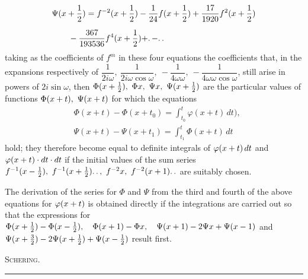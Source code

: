 \[
\begin{aligned}
&\Psi(x+\frac12)=f^{-2}(x+\frac12)-\frac{1}{24}f(x+\frac12)
+\frac{17}{1920}f^{2}(x+\frac12)\\[6pt]
&\qquad{}-\frac{367}{193536}f^{4}(x+\frac12)+\ldotp-\ldotp\ldotp
\end{aligned}
\]
taking as the coefficients of $f^m$ in these four equations the coefficients that, in the
expansions respectively of
$\dfrac{1}{2i\omega},\allowbreak{}\allowbreak \ \dfrac{1}{2i\omega\cos\omega},\allowbreak{}\allowbreak \ -\dfrac{1}{4\omega\omega},\allowbreak{}\allowbreak \ -\dfrac{1}{4\omega\omega\cos\omega}$,
still arise in powers of $2i\sin\omega$,
then $\Phi(x+\nobreak{}\tfrac12),\allowbreak{}\ \Phi x,\allowbreak{}\ \Psi x,\allowbreak{}\ \Psi(x+\nobreak{}\tfrac12)$ are the particular values of functions
$\Phi(x+\nobreak{}t),\allowbreak{}\ \Psi(x+\nobreak{}t)$
for which the equations
\[
\begin{aligned}
&\Phi(x+t)-\Phi(x+t_0)=\int_{t_0}^{t}\varphi(x+t)\,dt),\\[6pt]
&\Psi(x+t)-\Psi(x+t_1)=\int_{t_1}^{t}\Phi(x+t)\,dt
\end{aligned}
\]
hold; they therefore become equal to definite integrals of $\varphi(x+\nobreak{}t)\,\allowbreak{}dt$ and
$\varphi(x+\nobreak{}t)\cdot dt\cdot dt$ if
the initial values of the sum series
\hfill\break{}
$f^{-1}(x-\nobreak{}\tfrac12),\allowbreak{}\ f^{-1}(x+\nobreak{}\tfrac12)\ldotp\ldotp,\allowbreak{}\ f^{-2}x,\allowbreak{}\ f^{-2}(x+\nobreak{}1)\ldotp\ldotp$
are suitably chosen.

The derivation of the series for $\Phi$ and $\Psi$ from the third and fourth of the above equations for
$\varphi(x+\nobreak{}t)$ is obtained directly if the integrations are carried out so that the expressions for
\hfill\break{}
$\Phi(x+\nobreak{}\tfrac12)-\Phi(x-\nobreak{}\tfrac12),\allowbreak{}\quad \Phi(x+\nobreak{}1)-\Phi x,\allowbreak{}\quad
\Psi(x+\nobreak{}1)-2\Psi x+\Psi(x-\nobreak{}1)$ and
$\Psi(x+\nobreak{}\tfrac32)-2\Psi(x+\nobreak{}\tfrac12)+\Psi(x-\nobreak{}\tfrac12)$
result first.
\begin{flushright}\textsc{Schering.}\end{flushright}
\begin{center}\rule{9em}{0.3pt}\end{center}
\clearpage
\endgroup

